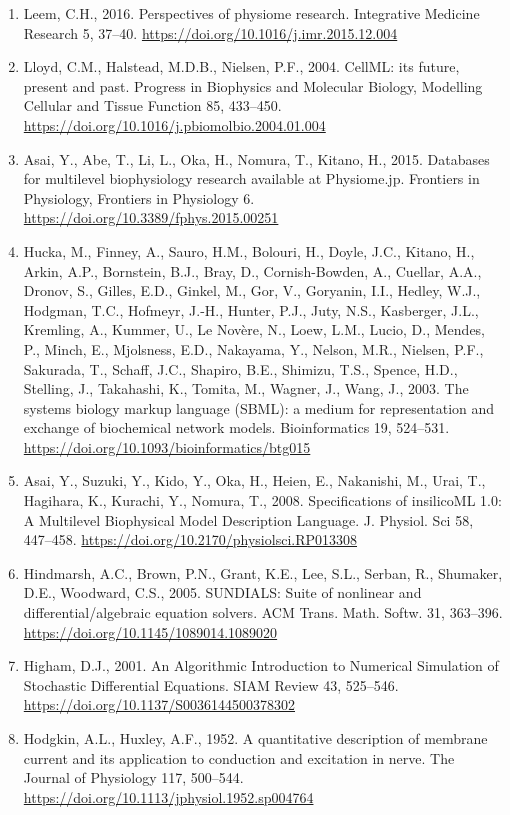 \documentclass[a4paper,10pt]{report}
\begin{document}
\begin{enumerate}
\item \label{org0abed00} Leem, C.H., 2016. Perspectives of physiome research. Integrative Medicine Research 5, 37–40. \url{https://doi.org/10.1016/j.imr.2015.12.004}
\item \label{orga9f6b5f} Lloyd, C.M., Halstead, M.D.B., Nielsen, P.F., 2004. CellML: its future, present and past. Progress in Biophysics and Molecular Biology, Modelling Cellular and Tissue Function 85, 433–450. \url{https://doi.org/10.1016/j.pbiomolbio.2004.01.004}
\item \label{org562aec9} Asai, Y., Abe, T., Li, L., Oka, H., Nomura, T., Kitano, H., 2015. Databases for multilevel biophysiology research available at Physiome.jp. Frontiers in Physiology, Frontiers in Physiology 6. \url{https://doi.org/10.3389/fphys.2015.00251}
\item \label{orged2d9c6} Hucka, M., Finney, A., Sauro, H.M., Bolouri, H., Doyle, J.C., Kitano, H., Arkin, A.P., Bornstein, B.J., Bray, D., Cornish-Bowden, A., Cuellar, A.A., Dronov, S., Gilles, E.D., Ginkel, M., Gor, V., Goryanin, I.I., Hedley, W.J., Hodgman, T.C., Hofmeyr, J.-H., Hunter, P.J., Juty, N.S., Kasberger, J.L., Kremling, A., Kummer, U., Le Novère, N., Loew, L.M., Lucio, D., Mendes, P., Minch, E., Mjolsness, E.D., Nakayama, Y., Nelson, M.R., Nielsen, P.F., Sakurada, T., Schaff, J.C., Shapiro, B.E., Shimizu, T.S., Spence, H.D., Stelling, J., Takahashi, K., Tomita, M., Wagner, J., Wang, J., 2003. The systems biology markup language (SBML): a medium for representation and exchange of biochemical network models. Bioinformatics 19, 524–531. \url{https://doi.org/10.1093/bioinformatics/btg015}
\item \label{orge39c7f1} Asai, Y., Suzuki, Y., Kido, Y., Oka, H., Heien, E., Nakanishi, M., Urai, T., Hagihara, K., Kurachi, Y., Nomura, T., 2008. Specifications of insilicoML 1.0: A Multilevel Biophysical Model Description Language. J. Physiol. Sci 58, 447–458. \url{https://doi.org/10.2170/physiolsci.RP013308}
\item \label{org6ee1751} Hindmarsh, A.C., Brown, P.N., Grant, K.E., Lee, S.L., Serban, R., Shumaker, D.E., Woodward, C.S., 2005. SUNDIALS: Suite of nonlinear and differential/algebraic equation solvers. ACM Trans. Math. Softw. 31, 363–396. \url{https://doi.org/10.1145/1089014.1089020}
\item \label{org137e7c6} Higham, D.J., 2001. An Algorithmic Introduction to Numerical Simulation of Stochastic Differential Equations. SIAM Review 43, 525–546. \url{https://doi.org/10.1137/S0036144500378302}
\item \label{org7f8f368} Hodgkin, A.L., Huxley, A.F., 1952. A quantitative description of membrane current and its application to conduction and excitation in nerve. The Journal of Physiology 117, 500–544. \url{https://doi.org/10.1113/jphysiol.1952.sp004764}
\end{enumerate}
\end{document}
